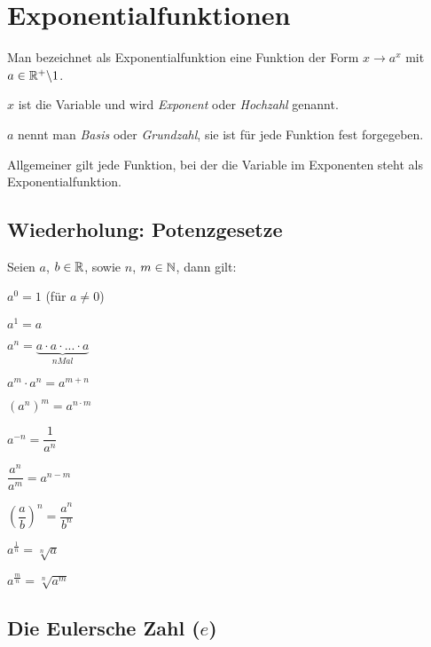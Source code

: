 \documentclass[main.tex]{subfiles}
\begin{document}
\chapter{Exponentialfunktionen}


\begin{Definition}
	Man bezeichnet als Exponentialfunktion eine Funktion der Form $x\rightarrow a^x$ mit $a\in \mathbb{R}^+\backslash 1$.

	$x$ ist die Variable und wird \textit{Exponent} oder \textit{Hochzahl} genannt.

	$a$ nennt man \textit{Basis} oder \textit{Grundzahl}, sie ist für jede Funktion fest forgegeben.

	Allgemeiner gilt jede Funktion, bei der die Variable im Exponenten steht als Exponentialfunktion.
\end{Definition}




\section{Wiederholung: Potenzgesetze}

\begin{Theorem}
	Seien $a$, $b\in\mathbb{R}$, sowie $n$, $m\in\mathbb{N}$, dann gilt:
	\begin{enumerate}
		\begin{minipage}{0.5\textwidth}
			\item$a^0=1$ (für $a\neq 0$)
			\item$a^1=a$
			\item$a^n=\underbrace{a\cdot a\cdot ... \cdot a}_{n Mal}$
			\item$a^m\cdot a^n=a^{m+n}$
			\item$(a^n)^m=a^{n\cdot m}$
		\end {minipage}
		\begin{minipage}{0.5\textwidth}
			\item$a^{-n}=\dfrac{1}{a^n}$
			\item$\dfrac{a^n}{a^m}=a^{n-m}$
			\item$\left(\dfrac{a}{b}\right)^n=\dfrac{a^n}{b^n}$
			\item $a^{\frac{1}{n}}=\sqrt[n]{a}$
			\item$a^{\frac{m}{n}}=\sqrt[n]{a^m}$
		\end {minipage}
	\end{enumerate}
\end{Theorem}


\section{Die Eulersche Zahl ($e$)}
\end{document}

